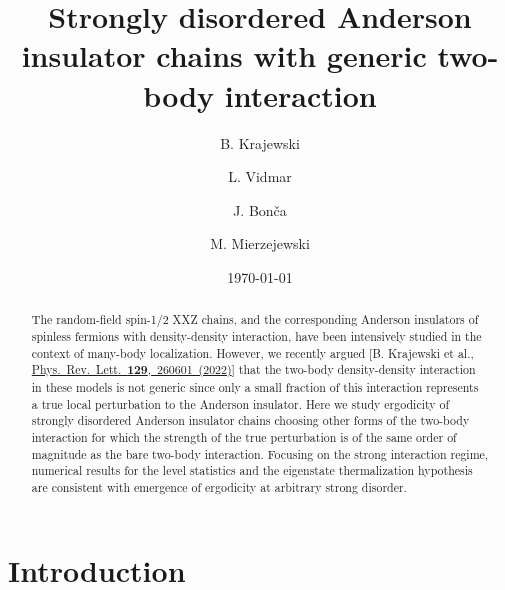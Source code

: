 \documentclass[twocolumn,pre,superscriptaddress,10pt,aps,floatfix]{revtex4-1}
\newcommand{\stoptocentries}{\renewcommand{\addcontentsline}[3]{}}
\begin{document}
\title{Strongly disordered Anderson insulator chains with generic two-body interaction}
\author{B. Krajewski}
\author{L. Vidmar}
\author{J. Bon\v ca}
\author{M. Mierzejewski}
\date{\today}
\begin{abstract}
The random-field spin-1/2 XXZ chains, and the corresponding Anderson insulators of spinless fermions with density-density interaction, have been intensively studied in the context of many-body localization. However, we recently argued [B. Krajewski et al., \href{https://doi.org/10.1103/PhysRevLett.129.260601}{Phys.~Rev.~Lett.~{\bf 129},~260601~(2022)}] that the two-body density-density interaction in these models is not generic since only a small fraction of this interaction represents a true local perturbation to the Anderson insulator.
Here we study ergodicity of strongly disordered Anderson insulator chains choosing other forms of the two-body interaction for which the strength of the true perturbation is of the same order of magnitude as the bare two-body interaction. Focusing on the strong interaction regime, numerical results for the level statistics and the eigenstate thermalization hypothesis are consistent with emergence of ergodicity at arbitrary strong disorder.
  
\end{abstract}
\maketitle
\stoptocentries

\section{Introduction}
\end{document}
